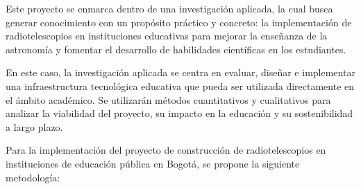 Este proyecto se enmarca dentro de una investigación aplicada, la cual busca
generar conocimiento con un propósito práctico y concreto: la implementación de
radiotelescopios en instituciones educativas para mejorar la enseñanza de la
astronomía y fomentar el desarrollo de habilidades científicas en los
estudiantes.

En este caso, la investigación aplicada se centra en evaluar, diseñar
e implementar una infraestructura tecnológica educativa que pueda ser utilizada
directamente en el ámbito académico. Se utilizarán métodos cuantitativos
y cualitativos para analizar la viabilidad del proyecto, su impacto en la
educación y su sostenibilidad a largo plazo.

Para la implementación del proyecto de construcción de radiotelescopios en
instituciones de educación pública en Bogotá, se propone la siguiente
metodología:

